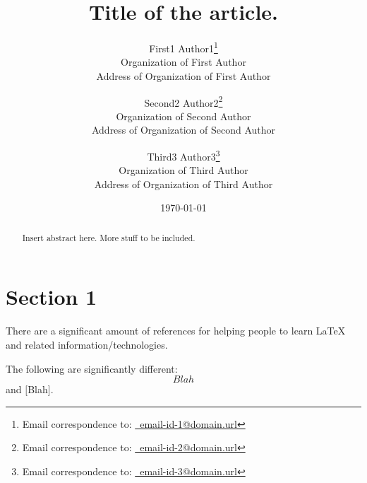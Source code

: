 \documentclass[letter,12pt]{article}
\begin{document}
\title{Title of the article.}
\date{\today}
\author{
	First1 Author1\thanks{Email correspondence to: \href{mailto:email-id-1@domain.url}{\Email\ email-id-1@domain.url}} \\
		Organization of First Author\\
		Address of Organization of First Author
	\and
	Second2 Author2\thanks{Email correspondence to: \href{mailto:email-id-2@domain.url}{\Email\ email-id-2@domain.url}} \\
		Organization of Second Author\\
		Address of Organization of Second Author
	\and
	Third3 Author3\thanks{Email correspondence to: \href{mailto:email-id-3@domain.url}{\Email\ email-id-3@domain.url}} \\
		Organization of Third Author\\
		Address of Organization of Third Author
}
\maketitle


\begin{abstract} 
Insert abstract here. More stuff to be included.
\end{abstract}





\section{Section 1}
\label{sec:mysection1}

There are a significant amount of references for helping people to learn \LaTeX \cite{Voss2011,vanDongen2012,Syropoulos2003,Raymond2004,Mittelbach2004,Lamport1994,Krishnan2003,Krantz2001,Kottwitz2011,Koranne2011,Kopka2004,Knuth1999,Hoenig1998,Higham1998,Haralambous2007,Griffiths1997,Gratzer2007,Goossens2007,Goossens1999,Goossens1997,Diller1999,Bindner2011,Berry2009,UITCambridge2011,Scharrer2011,Pakin2008,Cormen2010,Syropoulos2004,Hamalainen2006} and related information/technologies.


%	
The following are significantly different: \[Blah\] and $[$Blah$]$.
\end{document}
